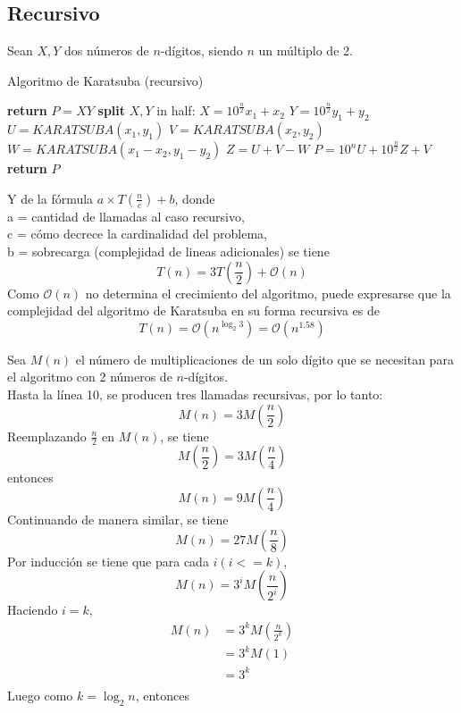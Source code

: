 \documentclass[a4paper,12pt]{article}
\begin{document}
\subsection{Recursivo}
\vspace{1cm}

Sean $X, Y$ dos números de $n$-dígitos, siendo $n$ un múltiplo de 2.

\vspace{.5cm}

\begin{algorithm}
\caption{Algoritmo de Karatsuba (recursivo)}
\begin{algorithmic}[1]

	 \State \textbf{return} $P = XY$
		\Else
			\State \textbf{split} $X, Y$ in half:
			\State $X = 10^\frac{n}{2} x_1 + x_2$
			\State $Y = 10^\frac{n}{2} y_1 + y_2$
			\State $U = KARATSUBA (x_1, y_1)$
			\State $V = KARATSUBA (x_2, y_2)$
			\State $W = KARATSUBA (x_1 - x_2, y_1 - y_2)$
			\State $Z = U + V - W$
			\State $P = 10^n  U + 10^\frac{n}{2} Z + V$
			\State \textbf{return} $P$
\end{algorithmic}
\end{algorithm}
\vspace{.5cm}
Y de la fórmula $a \times T(\frac{n}{c}) + b$, donde\\
\vspace{.5cm}
 a = cantidad de llamadas al caso recursivo,\\
 c = cómo decrece la cardinalidad del problema, \\
 b = sobrecarga (complejidad de lineas adicionales)
\vspace{.5cm}
se tiene
\[
	T(n) = 3T(\frac{n}{2}) + \mathcal{O}(n)
\]
\vspace{.5cm}
Como $\mathcal{O}(n)$ no determina el crecimiento del algoritmo, puede expresarse que la complejidad del algoritmo de Karatsuba en su forma recursiva es de 
\[
	T(n) = \mathcal{O}(n^{\log_2{3}}) = \mathcal{O}(n^{1.58})
\]

Sea $M(n)$ el número de multiplicaciones de un solo dígito que se necesitan para el algoritmo con 2 números de $n$-dígitos.\\
Hasta la línea 10, se producen tres llamadas recursivas, por lo tanto:
\[M(n) = 3M(\frac{n}{2})\]
Reemplazando $\frac{n}{2}$ en $M(n)$, se tiene 
\[M(\frac{n}{2}) = 3M(\frac{n}{4})\]
entonces 
\[M(n) = 9M(\frac{n}{4})\]
Continuando de manera similar, se tiene
\[M(n) = 27M(\frac{n}{8})\]
Por inducción se tiene que para cada $i (i<= k)$,
\[
	M(n) = 3^i M(\frac{n}{2^i})
\]
Haciendo $i=k$,
\begin{align*}
 M(n) &= 3^k M(\frac{n}{2^k})\\
 &= 3^k M(1)\\
 &= 3^k\\
\end{align*}
Luego como $k = \log_2{n}$, entonces
\end{document}
